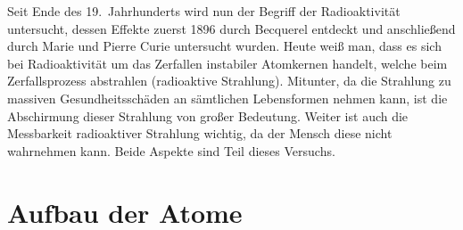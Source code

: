 Seit Ende des 19.~Jahrhunderts wird nun der Begriff der Radioaktivität untersucht, dessen Effekte zuerst 1896 durch Becquerel entdeckt und anschließend durch Marie und Pierre Curie untersucht wurden. Heute weiß man, dass es sich bei Radioaktivität um das Zerfallen instabiler Atomkernen handelt, welche beim Zerfallsprozess abstrahlen (radioaktive Strahlung). Mitunter, da die Strahlung zu massiven Gesundheitsschäden an sämtlichen Lebensformen nehmen kann, ist die Abschirmung dieser Strahlung von großer Bedeutung. Weiter ist auch die Messbarkeit radioaktiver Strahlung wichtig, da der Mensch diese nicht wahrnehmen kann. Beide Aspekte sind Teil dieses Versuchs. \cite{HW03}

\section{Aufbau der Atome}

